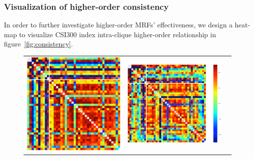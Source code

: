 \documentclass[sigconf]{acmart}
\begin{document}
\subsubsection{Visualization of higher-order consistency}

In order to further investigate higher-order MRFs' effectiveness,
we design a heat-map to visualize CSI300 index intra-clique
higher-order relationship in figure~\ref{fig:consistency}.

\begin{figure}[t]
  \centering
  \setlength{\tabcolsep}{20pt}
  \begin{tabular}{ccc}
  \includegraphics[width=0.45\columnwidth]{Methodology/figures/gt.png}&
  

    
\includegraphics[width=0.54\columnwidth]{Methodology/figures/hmpl.png}&


\end{tabular}
\end{figure}
\end{document}
